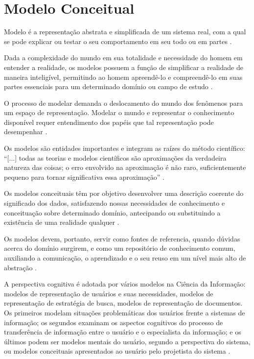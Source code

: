 

\chapter{\hspace*{3pt} Modelo Conceitual}
\label{chap:modeloConceitual}

Modelo é a representação abstrata e simplificada de um sistema real, com a qual se pode explicar ou testar o seu comportamento em seu todo ou em partes \cite{castro:2010.abordagem, cougo:1997.modelagem}.

Dada a complexidade do mundo em sua totalidade e necessidade do homem em entender a realidade, os modelos possuem a função de simplificar a realidade de maneira inteligível, permitindo ao homem apreendê-lo e compreendê-lo em suas partes essenciais para um determinado domínio ou campo de estudo \cite{almeida:2006.modelo, dodebei:2002.tesauro}.

O processo de modelar demanda o deslocamento do mundo dos fenômenos para um espaço de representação. Modelar o mundo e representar o conhecimento disponível requer entendimento dos papéis que tal representação pode desempenhar \cite{campos:2004.modelizacao}.

Os modelos são entidades importantes e integram as raízes do método científico: “[...] todas as teorias e modelos científicos são aproximações da verdadeira natureza das coisas; o erro envolvido na aproximação é não raro, suficientemente pequeno para tornar significativa essa aproximação” .

Os modelos conceituais têm por objetivo desenvolver uma descrição coerente do significado dos dados, satisfazendo nossas necessidades de conhecimento e conceituação sobre determinado domínio, antecipando ou substituindo a existência de uma realidade qualquer \cite{higuchi:2012.representaccao}.

Os modelos devem, portanto, servir como fontes de referencia, quando dúvidas acerca do domínio surgirem, e como um repositório de conhecimento comum, auxiliando a comunicação, o aprendizado e o seu reuso em um nível mais alto de abstração . 

A perspectiva cognitiva é adotada por vários modelos na Ciência da Informação: modelos de representação de usuários e suas necessidades, modelos de representação de estratégia de busca, modelos de representação de documentos. Os primeiros modelam situações problemáticas dos usuários frente a sistemas de informação; os segundos examinam os aspectos cognitivos do processo de transferência de informação entre o usuário e o especialista da informação; e os últimos podem ser modelos mentais do usuário, segundo a perspectiva do sistema, ou modelos conceituais apresentados ao usuário pelo projetista do sistema .

